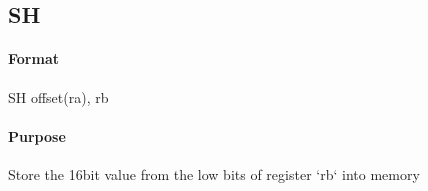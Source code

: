 \subsection{SH}


\paragraph{Format} SH offset(ra), rb

\paragraph{Purpose} Store the 16bit value from the low bits of register `rb` into memory
